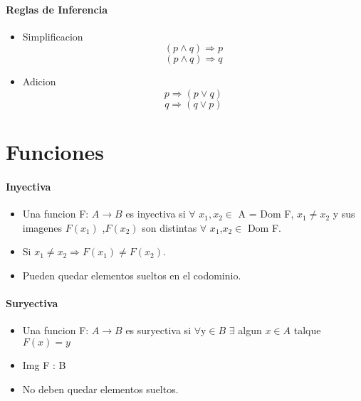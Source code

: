 \documentclass[a4paper]{article}
\begin{document}
\paragraph{Reglas de Inferencia}
\begin{itemize}
\item{Simplificacion}
	\begin{equation}
		(p \wedge q) \Rightarrow p  
	\end{equation}
	\begin{equation}
		(p \wedge q) \Rightarrow q
	\end{equation}

\item{Adicion}
	\begin{equation}
		p \Rightarrow (p \vee q)
	\end{equation}
	\begin{equation}
		q \Rightarrow ( q \vee p)
	\end{equation}

\end{itemize}


\section{Funciones}
\paragraph{Inyectiva}
\begin{itemize}
	\item Una funcion F: $A \rightarrow B$ es inyectiva si $\forall$ $x_1,x_2 \in$ A = Dom F, $x_1 \neq x_2$ y sus imagenes $F(x_1)$ ,$F(x_2)$ son distintas $\forall$ $x_1$,$ x_2 \in$ Dom F.

\item Si $x_1 \neq x_2 \Longrightarrow F(x_1) \neq F(x_2)$.

\item Pueden quedar elementos sueltos en el codominio.
\end{itemize}

\paragraph{Suryectiva}
\begin{itemize}
	\item Una funcion F: $A \rightarrow B$ es suryectiva si $\forall$y$\in B$ $\exists$ algun $x \in A$ talque $F(x)= y$
	\item Img F : B
	\item No deben quedar elementos sueltos.	
\end{itemize}
\end{document}
